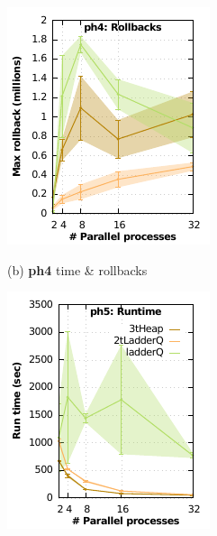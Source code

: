 \begin{figure}
\begin{minipage}{0.32\linewidth}
\begin{minipage}{0.49\linewidth}
\includegraphics[width=\linewidth]{images/ph4_Delay_10_Evt_10_rollbacks}
\end{minipage}
\centerline{(b) \textbf{ph4} time \& rollbacks}    
\end{minipage}
\begin{minipage}{0.32\linewidth}
\begin{minipage}{0.49\linewidth}
\includegraphics[width=\linewidth]{images/ph5_Delay_10_Evt_10_run_time}

\end{minipage}
\end{minipage}
\end{figure}
